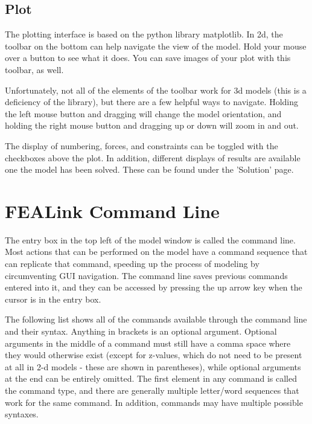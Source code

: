 \documentclass[11pt, oneside]{article}   	%
\begin{document}
\subsection{Plot}
The plotting interface is based on the python library matplotlib.  In 2d, the toolbar on the bottom can help navigate the view of the model.  Hold your mouse over a button to see what it does.  You can save images of your plot with this toolbar, as well.

Unfortunately, not all of the elements of the toolbar work for 3d models (this is a deficiency of the library), but there are a few helpful ways to navigate.  Holding the left mouse button and dragging will change the model orientation, and holding the right mouse button and dragging up or down will zoom in and out.  

The display of numbering, forces, and constraints can be toggled with the checkboxes above the plot.  In addition, different displays of results are available one the model has been solved.  These can be found under the 'Solution' page.


\section{FEALink Command Line}
The entry box in the top left of the model window is called the command line.  Most actions that can be performed on the model have a command sequence that can replicate that command, speeding up the process of modeling by circumventing GUI navigation.  The command line saves previous commands entered into it, and they can be accessed by pressing the up arrow key when the cursor is in the entry box.

The following list shows all of the commands available through the command line and their syntax.  Anything in brackets is an optional argument.  Optional arguments in the middle of a command must still have a comma space where they would otherwise exist (except for z-values, which do not need to be present at all in 2-d models - these are shown in parentheses), while optional arguments at the end can be entirely omitted.  The first element in any command is called the command type, and there are generally multiple letter/word sequences that work for the same command.  In addition, commands may have multiple possible syntaxes.
\end{document}
